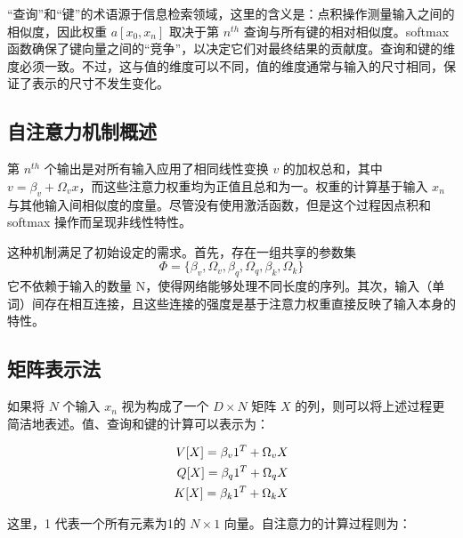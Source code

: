 \documentclass[lang=cn,newtx,10pt,scheme=chinese]{elegantbook}
\begin{document}
“查询”和“键”的术语源于信息检索领域，这里的含义是：点积操作测量输入之间的相似度，因此权重 \(a[x_0, x_n]\) 取决于第 \(n^{th}\) 查询与所有键的相对相似度。softmax 函数确保了键向量之间的“竞争”，以决定它们对最终结果的贡献度。查询和键的维度必须一致。不过，这与值的维度可以不同，值的维度通常与输入的尺寸相同，保证了表示的尺寸不发生变化。

\subsection{自注意力机制概述}
第 \(n^{th}\) 个输出是对所有输入应用了相同线性变换 \(v\) 的加权总和，其中 \(v = \beta_v + \Omega_vx\)，而这些注意力权重均为正值且总和为一。权重的计算基于输入 \(x_n\) 与其他输入间相似度的度量。尽管没有使用激活函数，但是这个过程因点积和 softmax 操作而呈现非线性特性。

这种机制满足了初始设定的需求。首先，存在一组共享的参数集 
\begin{equation*}
\Phi = \{\beta_v,\Omega_v,\beta_q,\Omega_q,\beta_k,\Omega_k\}    
\end{equation*}
它不依赖于输入的数量 N，使得网络能够处理不同长度的序列。其次，输入（单词）间存在相互连接，且这些连接的强度是基于注意力权重直接反映了输入本身的特性。

\subsection{矩阵表示法}
如果将 \(N\) 个输入 \(x_n\) 视为构成了一个 \(D \times N\) 矩阵 \(X\) 的列，则可以将上述过程更简洁地表述。值、查询和键的计算可以表示为：


\begin{align}
V[X] = \beta_v 1^T + \Omega_v X \notag \\
Q[X] = \beta_q 1^T + \Omega_q X \notag \\
K[X] = \beta_k 1^T + \Omega_k X 
\end{align} 


这里，1 代表一个所有元素为1的 \(N \times 1\) 向量。自注意力的计算过程则为：
\end{document}
